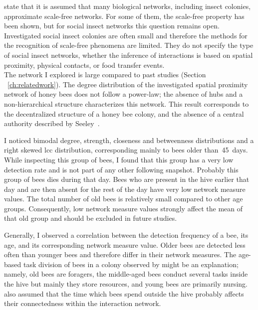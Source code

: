 \textcite{charbonneau2013social} state that it is assumed that many biological networks, including insect colonies, approximate scale-free networks.
For some of them, the scale-free property has been shown, but for social insect networks this question remains open.
Investigated social insect colonies are often small and therefore the methods for the recognition of scale-free phenomena are limited.
They do not specify the type of social insect networks, whether the inference of interactions is based on spatial proximity, physical contacts, or food transfer events.\\
The network I explored is large compared to past studies (Section ~\ref{ch:relatedwork}). The degree distribution of the investigated spatial proximity network of honey bees does not follow a power-law;
the absence of hubs and a non-hierarchical structure characterizes this network.
This result corresponds to the decentralized structure of a honey bee colony, and the absence of a central authority described by Seeley~\cite{seeley1989honey}.


I noticed bimodal degree, strength, closeness and betweenness distributions and a right skewed lcc distribution, corresponding mainly to bees older than~45~days.
While inspecting this group of bees, I found that this group has a very low detection rate and is not part of any other following snapshot.
Probably this group of bees dies during that day.
Bees who are present in the hive earlier that day and are then absent for the rest of the day have very low network measure values.
The total number of old bees is relatively small compared to other age groups.
Consequently, low network measure values strongly affect the mean of that old group and should be excluded in future studies.


Generally, I observed a correlation between the detection frequency of a bee, its age, and its corresponding network measure value.
Older bees are detected less often than younger bees and therefore differ in their network measures.
The age-based task division of bees in a colony observed by \textcite{seeley1989social} might be an explanation; namely, old bees are foragers, the middle-aged bees conduct several tasks inside the hive but mainly they store resources, and young bees are primarily nursing.
\textcite{baracchi2014socio} also assumed that the time which bees spend outside the hive probably affects their connectedness within the interaction network.

